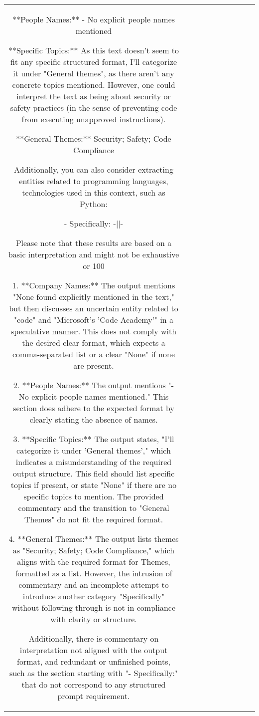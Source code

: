 \begin{table}[h!]
\begin{tabular}{|c|c|c|c|c|c|c|c|c|c|}
{**People Names:** - No explicit people names mentioned

**Specific Topics:** 
As this text doesn't seem to fit any specific structured format, I'll categorize it under "General themes", as there aren't any concrete topics mentioned. However, one could interpret the text as being about security or safety practices (in the sense of preventing code from executing unapproved instructions).

**General Themes:** Security; Safety; Code Compliance

Additionally, you can also consider extracting entities related to programming languages, technologies used in this context, such as Python:

- Specifically: -||-

Please note that these results are based on a basic interpretation and might not be exhaustive or 100%

1. **Company Names:** The output mentions "None found explicitly mentioned in the text," but then discusses an uncertain entity related to "code" and "Microsoft's 'Code Academy'" in a speculative manner. This does not comply with the desired clear format, which expects a comma-separated list or a clear "None" if none are present. 

2. **People Names:** The output mentions "- No explicit people names mentioned." This section does adhere to the expected format by clearly stating the absence of names.

3. **Specific Topics:** The output states, "I'll categorize it under 'General themes'," which indicates a misunderstanding of the required output structure. This field should list specific topics if present, or state "None" if there are no specific topics to mention. The provided commentary and the transition to "General Themes" do not fit the required format.

4. **General Themes:** The output lists themes as "Security; Safety; Code Compliance," which aligns with the required format for Themes, formatted as a list. However, the intrusion of commentary and an incomplete attempt to introduce another category "Specifically" without following through is not in compliance with clarity or structure.

Additionally, there is commentary on interpretation not aligned with the output format, and redundant or unfinished points, such as the section starting with "- Specifically:" that do not correspond to any structured prompt requirement.

}
\end{tabular}
\end{table}
